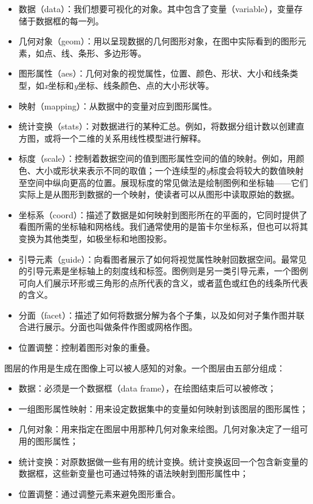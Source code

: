 \documentclass[11pt,a4paper,twoside]{book}
\begin{document}
\begin{itemize}
  \item 数据（data）：我们想要可视化的对象。其中包含了变量（variable），变量存储于数据框的每一列。
  \item 几何对象（geom）：用以呈现数据的几何图形对象，在图中实际看到的图形元素，如点、线、条形、多边形等。
  \item 图形属性（aes）：几何对象的视觉属性，位置、颜色、形状、大小和线条类型，如\textit{x}坐标和\textit{y}坐标、线条颜色、点的大小形状等。
  \item 映射（mapping）：从数据中的变量对应到图形属性。
  \item 统计变换（stats）：对数据进行的某种汇总。例如，将数据分组计数以创建直方图，或将一个二维的关系用线性模型进行解释。
  \item 标度（scale）：控制着数据空间的值到图形属性空间的值的映射。例如，用颜色、大小或形状来表示不同的取值；一个连续型的\textit{y}标度会将较大的数值映射至空间中纵向更高的位置。展现标度的常见做法是绘制图例和坐标轴——它们实际上是从图形到数据的一个映射，使读者可以从图形中读取原始的数据。
  \item 坐标系（coord）：描述了数据是如何映射到图形所在的平面的，它同时提供了看图所需的坐标轴和网格线。我们通常使用的是笛卡尔坐标系，但也可以将其变换为其他类型，如极坐标和地图投影。
  \item 引导元素（guide）：向看图者展示了如何将视觉属性映射回数据空间。最常见的引导元素是坐标轴上的刻度线和标签。图例则是另一类引导元素，一个图例可向人们展示环形或三角形的点所代表的含义，或者蓝色或红色的线条所代表的含义。
  \item 分面（facet）：描述了如何将数据分解为各个子集，以及如何对子集作图并联合进行展示。分面也叫做条件作图或网格作图。
  \item 位置调整：控制着图形对象的重叠。
\end{itemize}

图层的作用是生成在图像上可以被人感知的对象。一个图层由五部分组成：
\begin{itemize}
  \item 数据：必须是一个数据框（data frame），在绘图结束后可以被修改；
  \item 一组图形属性映射：用来设定数据集中的变量如何映射到该图层的图形属性；
  \item 几何对象：用来指定在图层中用那种几何对象来绘图。几何对象决定了一组可用的图形属性；
  \item 统计变换：对原数据做一些有用的统计变换。统计变换返回一个包含新变量的数据框，这些新变量也可通过特殊的语法映射到图形属性中；
  \item 位置调整：通过调整元素来避免图形重合。
\end{itemize}
\end{document}
